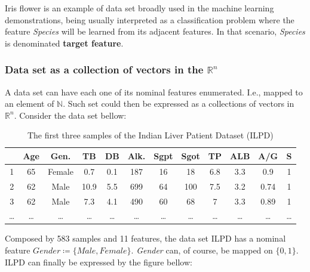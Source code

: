 \documentclass[12pt]{article}
\begin{document}
Iris flower is an example of data set broadly used in the machine learning demonstrations, being usually interpreted as a classification problem where the feature {\em Species} will be learned from its adjacent features. In that scenario, {\em Species} is denominated \textbf{target feature}.

\subsubsection{Data set as a collection of vectors in the $\mathbb{R}^n$}

A data set can have each one of its nominal features enumerated. I.e., mapped to an element of $\mathbb{N}$. Such set could then be expressed as a collections of vectors in $\mathbb{R}^n$.
Consider the data set bellow:

\begin{table}[H]
	\begin{tabular}{ c | *{11}{|c}| }
		& \textbf{Age}
		& \textbf{Gen.}
		& \textbf{TB}
		& \textbf{DB}
		& \textbf{Alk.}
		& \textbf{Sgpt}
		& \textbf{Sgot}
		& \textbf{TP}
		& \textbf{ALB}
		& \textbf{A/G}
		& \textbf{S} \\
		 & 65 & Female & 0.7 & 0.1 & 187 & 16 & 18 & 6.8 & 3.3 & 0.9 & 1 \\
		2 & 62 & Male & 10.9 & 5.5 & 699 & 64 & 100 & 7.5 & 3.2 & 0.74 & 1 \\
		3 & 62 & Male & 7.3 & 4.1 & 490 & 60 & 68 & 7 & 3.3 & 0.89 & 1\\
		… & … & … & … & … & … & … & … & … & … & … & … \\
	\end{tabular}

	\caption{The first three samples of the Indian Liver Patient Dataset (ILPD)}
\end{table}

Composed by 583 samples and 11 features, the data set ILPD has a nominal feature $Gender \coloneqq \{Male, Female\}$. {\em Gender} can, of course, be mapped on $\{0, 1\}$. ILPD can finally be expressed by the figure bellow:
\end{document}
